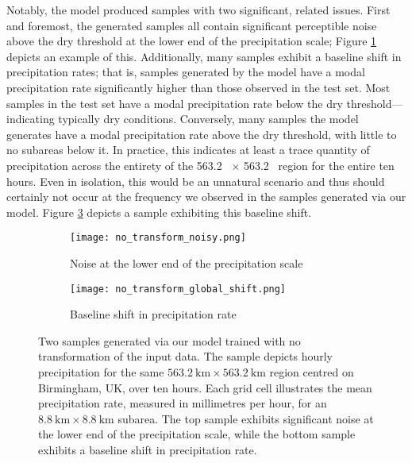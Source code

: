 \documentclass[ oneside,%
                    author={George Herbert},
                    degree={MSci},
                     title={Video Diffusion Models for Climate Simulations},
                  subtitle={}]{dissertation}
\begin{document}
Notably, the model produced samples with two significant, related issues. First and foremost, the generated samples all contain significant perceptible noise above the dry threshold at the lower end of the precipitation scale; Figure \ref{fig:no_transform_sample} depicts an example of this. Additionally, many samples exhibit a baseline shift in precipitation rates; that is, samples generated by the model have a modal precipitation rate significantly higher than those observed in the test set. Most samples in the test set have a modal precipitation rate below the dry threshold---indicating typically dry conditions. Conversely, many samples the model generates have a modal precipitation rate above the dry threshold, with little to no subareas below it. In practice, this indicates at least a trace quantity of precipitation across the entirety of the 563.2\  $\times$ 563.2\  region for the entire ten hours. Even in isolation, this would be an unnatural scenario and thus should certainly not occur at the frequency we observed in the samples generated via our model. Figure \ref{fig:no_transform_global_shift} depicts a sample exhibiting this baseline shift.

\begin{figure}[htbp]
      \centering
      \begin{subfigure}{\textwidth}
            \texttt{[image: no\_transform\_noisy.png]}
            \caption{Noise at the lower end of the precipitation scale}
            \label{fig:no_transform_sample}
      \end{subfigure}
      \begin{subfigure}{\textwidth}
            \texttt{[image: no\_transform\_global\_shift.png]}
            \caption{Baseline shift in precipitation rate}
            \label{fig:no_transform_global_shift}
      \end{subfigure}
      \caption{Two samples generated via our model trained with no transformation of the input data. The sample depicts hourly precipitation for the same $563.2\ \mathrm{km} \times 563.2\ \mathrm{km}$ region centred on Birmingham, UK, over ten hours. Each grid cell illustrates the mean precipitation rate, measured in millimetres per hour, for an $8.8 \ \mathrm{km} \times 8.8\ \mathrm{km}$ subarea. The top sample exhibits significant noise at the lower end of the precipitation scale, while the bottom sample exhibits a baseline shift in precipitation rate.}
\end{figure}
\end{document}
